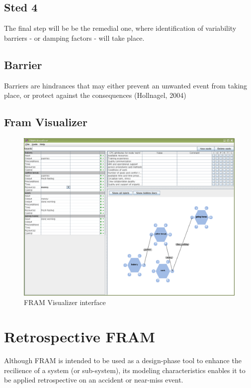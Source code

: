 \subsection*{Sted 4}
The final step will be be the remedial one, where identification of variability barriers - or damping factors - will take place.


\subsection{Barrier}
Barriers are hindrances that may either prevent an unwanted event from taking place, or protect against the consequences (Hollnagel, 2004)

\subsection{Fram Visualizer}


\begin{figure}
 \centering
   \includegraphics[width=320pt]{figures/framvisualizer1.png}
 \caption{FRAM Visualizer interface}
 \label{fig:fram_visualizer_interface}
\end{figure}

\section{Retrospective FRAM}
Although FRAM is intended to be used as a design-phase tool to enhance the recilience of a system (or sub-system), its modeling characteristics enables it to be applied retrospective on an accident or near-miss event.

